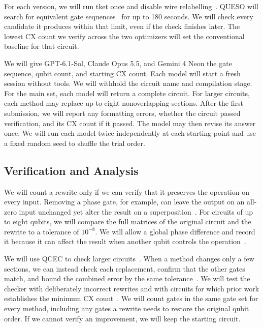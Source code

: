\documentclass[12pt]{article}
\begin{document}
For each version, we will run tket once and disable wire relabelling~\cite{tket-peephole}. QUESO will search for equivalent gate sequences~\cite{queso} for up to 180 seconds. We will check every candidate it produces within that limit, even if the check finishes later. The lowest CX count we verify across the two optimizers will set the conventional baseline for that circuit.

We will give GPT-6.1-Sol, Claude Opus 5.5, and Gemini 4 Neon the gate sequence, qubit count, and starting CX count. Each model will start a fresh session without tools. We will withhold the circuit name and compilation stage. For the main set, each model will return a complete circuit. For larger circuits, each method may replace up to eight nonoverlapping sections. After the first submission, we will report any formatting errors, whether the circuit passed verification, and its CX count if it passed. The model may then revise its answer once. We will run each model twice independently at each starting point and use a fixed random seed to shuffle the trial order.

\subsection{Verification and Analysis}

We will count a rewrite only if we can verify that it preserves the operation on every input. Removing a phase gate, for example, can leave the output on an all-zero input unchanged yet alter the result on a superposition~\cite{burgholzer-wille}. For circuits of up to eight qubits, we will compare the full matrices of the original circuit and the rewrite to a tolerance of $10^{-8}$. We will allow a global phase difference and record it because it can affect the result when another qubit controls the operation~\cite{araujo}.

We will use QCEC to check larger circuits~\cite{qcec-doc}. When a method changes only a few sections, we can instead check each replacement, confirm that the other gates match, and bound the combined error by the same tolerance~\cite{nielsen-chuang}. We will test the checker with deliberately incorrect rewrites and with circuits for which prior work establishes the minimum CX count~\cite{shende}. We will count gates in the same gate set for every method, including any gates a rewrite needs to restore the original qubit order. If we cannot verify an improvement, we will keep the starting circuit.
\end{document}

